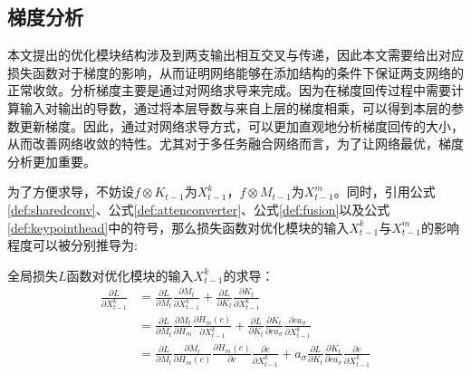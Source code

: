 \subsection{梯度分析}
\label{subsec:gradient}
本文提出的优化模块结构涉及到两支输出相互交叉与传递，因此本文需要给出对应损失函数对于梯度的影响，从而证明网络能够在添加结构的条件下保证两支网络的正常收敛。分析梯度主要是通过对网络求导来完成。因为在梯度回传过程中需要计算输入对输出的导数，通过将本层导数与来自上层的梯度相乘，可以得到本层的参数更新梯度。因此，通过对网络求导方式，可以更加直观地分析梯度回传的大小，从而改善网络收敛的特性。尤其对于多任务融合网络而言，为了让网络最优，梯度分析更加重要。

为了方便求导，不妨设$f \otimes K_{t-1}$为$X^k_{t-1}$，$f \otimes M_{t-1}$为$X^m_{t-1}$。同时，引用公式\eqref{def:sharedconv}、公式\eqref{def:attenconverter}、公式\eqref{def:fusion}以及公式\eqref{def:keypointhead}中的符号，那么损失函数对优化模块的输入$X^k_{t-1}$与$X^m_{t-1}$的影响程度可以被分别推导为:
\begin{corollary}
\label{corollary:loss2xk}
全局损失$L$函数对优化模块的输入$X^k_{t-1}$的求导：
\begin{equation*}
\begin{aligned}
\frac{\partial L}{\partial X_{t-1}^k} &= \frac{\partial L}{\partial M_t}\frac{\partial M_t}{\partial X_{t-1}^k} + \frac{\partial L}{\partial K_t}\frac{\partial K_t}{\partial X_{t-1}^k}\\
&= \frac{\partial L}{\partial M_t}\frac{\partial M_t}{\partial H_m}\frac{\partial H_m(c)}{\partial X_{t-1}^k} + \frac{\partial L}{\partial K_t}\frac{\partial K_t}{\partial ca_{\sigma}}\frac{\partial ca_{\sigma}}{\partial X_{t-1}^k}\\
&= \frac{\partial L}{\partial M_t}\frac{\partial M_t}{\partial H_m(c)}\frac{\partial H_m(c)}{\partial c}\frac{\partial c}{\partial X_{t-1}^k} + a_{\sigma}\frac{\partial L}{\partial K_t}\frac{\partial K_t}{\partial ca_{\sigma}}\frac{\partial c}{\partial X_{t-1}^k}
\end{aligned}
\end{equation*}
\end{corollary}
